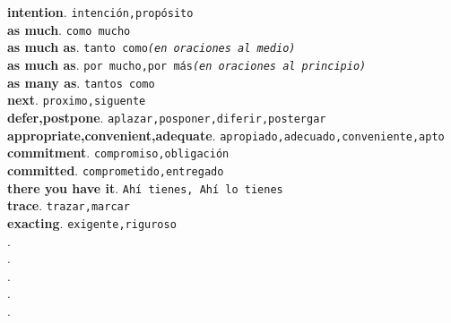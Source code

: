 \documentclass[twocolumn]{article}
\begin{document}
	\textsf{\textbf{intention}}. \texttt{intenci\'on,prop\'osito}\\
	\textsf{\textbf{as much}}. \texttt{como mucho}\\
	\textsf{\textbf{as much as}}. \texttt{tanto como{\scriptsize \textsl{(en oraciones al medio)}}}\\
	\textsf{\textbf{as much as}}. \texttt{por mucho,por m\'as{\scriptsize \textsl{(en oraciones al principio)}}}\\
	\textsf{\textbf{as many as}}. \texttt{tantos como}\\
	\textsf{\textbf{next}}. \texttt{proximo,siguente}\\
	\textsf{\textbf{defer,postpone}}. \texttt{aplazar,posponer,diferir,postergar}\\
	\textsf{\textbf{appropriate,convenient,adequate}}. \texttt{apropiado,adecuado,conveniente,apto}\\
	\textsf{\textbf{commitment}}. \texttt{compromiso,obligaci\'on}\\
	\textsf{\textbf{committed}}. \texttt{comprometido,entregado}\\
	\textsf{\textbf{there you have it}}. \texttt{Ah\'i tienes, Ah\'i lo tienes}\\
	\textsf{\textbf{trace}}. \texttt{trazar,marcar}\\
	\textsf{\textbf{exacting}}. \texttt{exigente,riguroso}\\
	\textsf{\textbf{}}. \texttt{}\\
	\textsf{\textbf{}}. \texttt{}\\
	\textsf{\textbf{}}. \texttt{}\\
	\textsf{\textbf{}}. \texttt{}\\
	\textsf{\textbf{}}. \texttt{}\\
\end{document}
